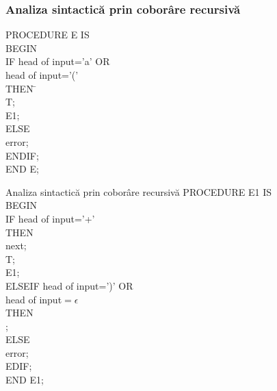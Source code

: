 \documentclass[pdf]{beamer}
\begin{document}
\begin{frame}[fragile]
\frametitle{Analiza sintactică prin coborâre recursivă}
\begin{tabbing}
	PROCEDURE E IS\\
	BEGIN \= \\
		\> IF	head of input='a' OR\\
		\> \hspace{0.3cm}	head of input='(' \\
		\> THEN \= \+ \\
			\> T; \\
      		\> E1; \\
		ELSE \\
			\> error;\\
		ENDIF;\- \\
	END E;\\
\end{tabbing}
\end{frame}



\begin{frame}{Analiza sintactică prin coborâre recursivă}
PROCEDURE E1 IS\\
BEGIN \\
\hspace{1cm} IF \hspace{1cm} head of input='+'\\
\hspace{1cm} THEN \\
\hspace{1cm}     \hspace*{1cm} next; \\
\hspace{1cm} 	\hspace*{1cm} T; \\
\hspace{1cm} 	\hspace*{1cm} E1; \\
\hspace{1cm} ELSEIF \hspace{1cm}head of input=')' OR\\
\hspace{1cm} 	\hspace*{2.3cm}head of input$=\epsilon$\\
\hspace{1cm} THEN \\
\hspace{1cm} \hspace{1.2cm} ;\\
\hspace{1cm} ELSE \\
\hspace{1cm} \hspace*{1cm} error;\\
\hspace{1cm} EDIF;\\
END E1;
\end{frame}
\end{document}
